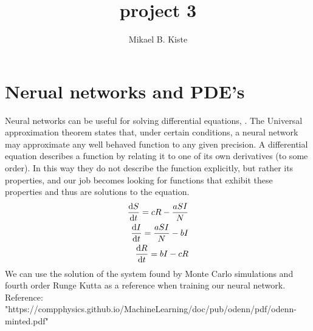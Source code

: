\documentclass{report}
\author{Mikael B. Kiste}
\title{project 3}
\begin{document}
	\section{Nerual networks and PDE's}
	Neural networks can be useful for solving differential equations, . The Universal approximation theorem states that, under certain conditions, a neural network may approximate any well behaved function to any given precision. A differential equation describes a function by relating it to one of its own derivatives (to some order). In this way they do not describe the function explicitly, but rather its properties, and our job becomes looking for functions that exhibit these properties and thus are solutions to the equation.\\
	\begin{align*}
		\dv{S}{t} = cR -\frac{aSI}{N}\\
		\dv{I}{t} = \frac{aSI}{N}-bI\\
		\dv{R}{t} = bI - cR
	\end{align*}
	We can use the solution of the system found by Monte Carlo simulations and fourth order Runge Kutta as a reference when training our neural network. 
	\\Reference: "https://compphysics.github.io/MachineLearning/doc/pub/odenn/pdf/odenn-minted.pdf"
\end{document}
